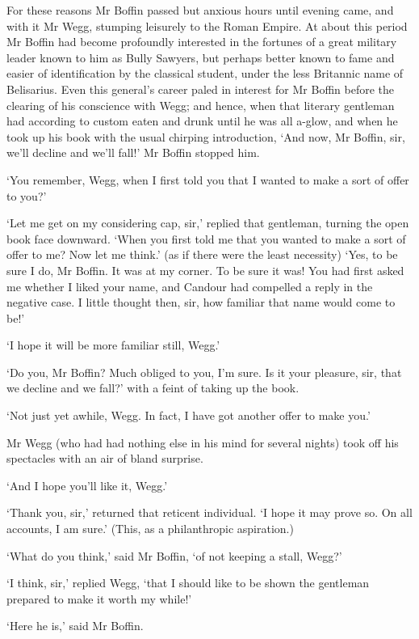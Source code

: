 For these reasons Mr Boffin passed but anxious hours until evening came,
and with it Mr Wegg, stumping leisurely to the Roman Empire. At about
this period Mr Boffin had become profoundly interested in the fortunes
of a great military leader known to him as Bully Sawyers, but perhaps
better known to fame and easier of identification by the classical
student, under the less Britannic name of Belisarius. Even this
general’s career paled in interest for Mr Boffin before the clearing of
his conscience with Wegg; and hence, when that literary gentleman had
according to custom eaten and drunk until he was all a-glow, and when
he took up his book with the usual chirping introduction, ‘And now, Mr
Boffin, sir, we’ll decline and we’ll fall!’ Mr Boffin stopped him.

‘You remember, Wegg, when I first told you that I wanted to make a sort
of offer to you?’

‘Let me get on my considering cap, sir,’ replied that gentleman, turning
the open book face downward. ‘When you first told me that you wanted
to make a sort of offer to me? Now let me think.’ (as if there were the
least necessity) ‘Yes, to be sure I do, Mr Boffin. It was at my corner.
To be sure it was! You had first asked me whether I liked your name,
and Candour had compelled a reply in the negative case. I little thought
then, sir, how familiar that name would come to be!’

‘I hope it will be more familiar still, Wegg.’

‘Do you, Mr Boffin? Much obliged to you, I’m sure. Is it your pleasure,
sir, that we decline and we fall?’ with a feint of taking up the book.

‘Not just yet awhile, Wegg. In fact, I have got another offer to make
you.’

Mr Wegg (who had had nothing else in his mind for several nights) took
off his spectacles with an air of bland surprise.

‘And I hope you’ll like it, Wegg.’

‘Thank you, sir,’ returned that reticent individual. ‘I hope it may
prove so. On all accounts, I am sure.’ (This, as a philanthropic
aspiration.)

‘What do you think,’ said Mr Boffin, ‘of not keeping a stall, Wegg?’

‘I think, sir,’ replied Wegg, ‘that I should like to be shown the
gentleman prepared to make it worth my while!’

‘Here he is,’ said Mr Boffin.

